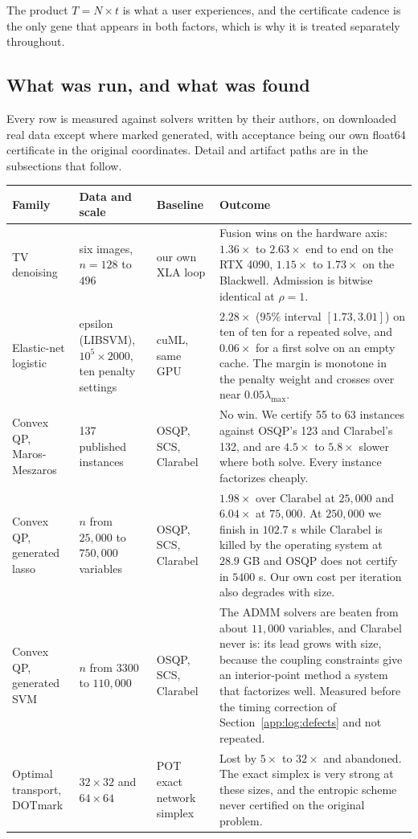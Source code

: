 The product $T = N \times t$ is what a user experiences, and the certificate
cadence is the only gene that appears in both factors, which is why it is
treated separately throughout.

\subsection{What was run, and what was found}
\label{app:log:scoreboard}

Every row is measured against solvers written by their authors, on downloaded
real data except where marked generated, with acceptance being our own
float64 certificate in the original coordinates. Detail and artifact paths are
in the subsections that follow.

\begin{center}
\small
\begin{tabular}{p{2.5cm}p{2.6cm}p{2.2cm}p{6.1cm}}
\toprule
Family & Data and scale & Baseline & Outcome \\
\midrule
TV denoising & six images, $n=128$ to $496$ & our own XLA loop & Fusion wins on the hardware axis: $1.36\times$ to $2.63\times$ end to end on the RTX 4090, $1.15\times$ to $1.73\times$ on the Blackwell. Admission is bitwise identical at $\rho=1$. \\
\addlinespace
Elastic-net logistic & epsilon (LIBSVM), $10^5\times2000$, ten penalty settings & cuML, same GPU & $2.28\times$ ($95\%$ interval $[1.73, 3.01]$) on ten of ten for a repeated solve, and $0.06\times$ for a first solve on an empty cache. The margin is monotone in the penalty weight and crosses over near $0.05\lambda_{\max}$. \\
\addlinespace
Convex QP, Maros-Meszaros & 137 published instances & OSQP, SCS, Clarabel & No win. We certify 55 to 63 instances against OSQP's 123 and Clarabel's 132, and are $4.5\times$ to $5.8\times$ slower where both solve. Every instance factorizes cheaply. \\
\addlinespace
Convex QP, generated lasso & $n$ from $25{,}000$ to $750{,}000$ variables & OSQP, SCS, Clarabel & $1.98\times$ over Clarabel at $25{,}000$ and $6.04\times$ at $75{,}000$. At $250{,}000$ we finish in $102.7$ s while Clarabel is killed by the operating system at $28.9$ GB and OSQP does not certify in $5400$ s. Our own cost per iteration also degrades with size. \\
\addlinespace
Convex QP, generated SVM & $n$ from $3300$ to $110{,}000$ & OSQP, SCS, Clarabel & The ADMM solvers are beaten from about $11{,}000$ variables, and Clarabel never is: its lead grows with size, because the coupling constraints give an interior-point method a system that factorizes well. Measured before the timing correction of Section~\ref{app:log:defects} and not repeated. \\
\addlinespace
Optimal transport, DOTmark & $32\times32$ and $64\times64$ & POT exact network simplex & Lost by $5\times$ to $32\times$ and abandoned. The exact simplex is very strong at these sizes, and the entropic scheme never certified on the original problem. \\
\bottomrule
\end{tabular}
\end{center}

